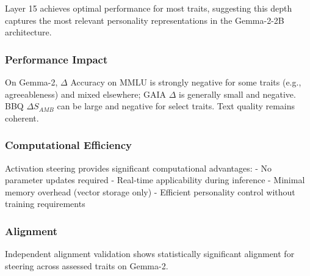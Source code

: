 Layer 15 achieves optimal performance for most traits, suggesting this depth captures the most relevant personality representations in the Gemma-2-2B architecture.

\subsubsection{Performance Impact}

On Gemma-2, \(\Delta\) Accuracy on MMLU is strongly negative for some traits (e.g., agreeableness) and mixed elsewhere; GAIA \(\Delta\) is generally small and negative. BBQ \(\Delta S_{AMB}\) can be large and negative for select traits. Text quality remains coherent.

\subsubsection{Computational Efficiency}

Activation steering provides significant computational advantages:
- No parameter updates required
- Real-time applicability during inference
- Minimal memory overhead (vector storage only)
- Efficient personality control without training requirements

\subsubsection{Alignment}
Independent alignment validation shows statistically significant alignment for steering across assessed traits on Gemma-2.
